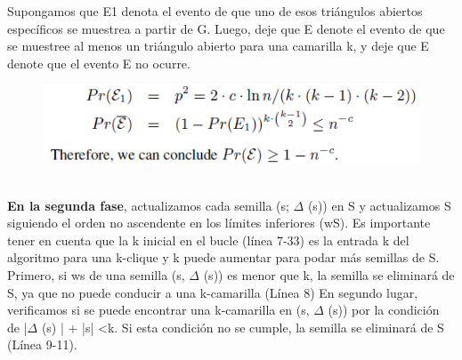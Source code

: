 Supongamos que E1 denota el evento de que uno de esos triángulos abiertos específicos se muestrea a partir de G. Luego, deje que E denote el evento de que se muestree al menos un triángulo abierto para una camarilla k, y deje que E denote que el evento E no ocurre.
\\
\begin{figure}[h!]
\centering
\includegraphics[scale=.8]{img/imagen13.png}
\label{Comandos}
\end{figure}
\\
\textbf{En la segunda fase}, actualizamos cada semilla (s; \begin{math}\Delta\end{math} (s)) en S y actualizamos S siguiendo el orden no ascendente en los límites inferiores (wS). Es importante tener en cuenta que la k inicial en el bucle (línea 7-33) es la entrada k del algoritmo para una k-clique y k puede aumentar para podar más semillas de S.
Primero, si ws de una semilla (s, \begin{math}\Delta\end{math} (s)) es menor que k, la semilla se eliminará de S, ya que no puede conducir a una k-camarilla (Línea 8) En segundo lugar, verificamos si se puede encontrar una k-camarilla en (s, \begin{math}\Delta\end{math} (s)) por la condición de |\begin{math}\Delta\end{math} (s) | + |s| <k. Si esta condición no se cumple, la semilla se eliminará de S (Línea 9-11). 
\\
